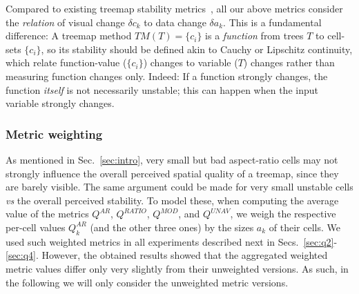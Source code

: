 \noindent Compared to existing treemap stability metrics~\citep{ordered,hahn10,hilbert_moore,sondag17}, all our above metrics consider the \emph{relation} of visual change $\delta c_k$ to data change $\delta a_k$. This is a fundamental difference: A treemap method $TM(T) = \{c_i\}$ is a \emph{function} from trees $T$ to cell-sets $\{c_i\}$, so its stability should be defined akin to Cauchy or Lipschitz continuity, which relate function-value ($\{c_i\}$) changes to variable ($T$) changes rather than measuring function changes only. Indeed: If a function strongly changes, the function \emph{itself} is not necessarily unstable; this can happen when the input variable strongly changes.

\subsubsection{Metric weighting}
%
As mentioned in Sec.~\ref{sec:intro}, very small but bad aspect-ratio cells may not strongly influence the overall perceived spatial quality of a treemap, since they are barely visible. The same argument could be made for very small unstable cells \emph{vs} the overall perceived stability. To model these, when computing the average value of the metrics $Q^{AR}$, $Q^{RATIO}$, $Q^{MOD}$, and $Q^{UNAV}$, we weigh the respective per-cell values $Q^{AR}_k$ (and the other three ones) by the sizes $a_k$ of their cells. We used such weighted metrics in all experiments described next in Secs.~\ref{sec:q2}-\ref{sec:q4}. However, the obtained results showed that the aggregated weighted metric values differ only very slightly from their unweighted versions. As such, in the following we will only consider the unweighted metric versions.


